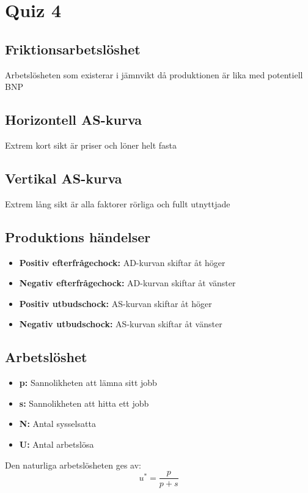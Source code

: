 \documentclass[12pt,a4paper]{article}
\begin{document}
\section{Quiz 4}
\subsection{Friktionsarbetslöshet}
Arbetslösheten som existerar i jämnvikt då produktionen är lika med potentiell BNP

\subsection{Horizontell AS-kurva}
Extrem kort sikt är priser och löner helt fasta

\subsection{Vertikal AS-kurva}
Extrem lång sikt är alla faktorer rörliga och fullt utnyttjade

\subsection{Produktions händelser}
\begin{itemize}
    \item \textbf{Positiv efterfrågechock: }AD-kurvan skiftar åt höger
    \item \textbf{Negativ efterfrågechock: }AD-kurvan skiftar åt vänster
    \item \textbf{Positiv utbudschock: }AS-kurvan skiftar åt höger
    \item \textbf{Negativ utbudschock: }AS-kurvan skiftar åt vänster
\end{itemize}

\subsection{Arbetslöshet}
\begin{itemize}
    \item \textbf{p: }Sannolikheten att lämna sitt jobb
    \item \textbf{s: }Sannolikheten att hitta ett jobb
    \item \textbf{N: }Antal sysselsatta
    \item \textbf{U: }Antal arbetslösa
\end{itemize}
Den naturliga arbetslösheten ges av:
\[
u^* = \frac{p}{p+s}
\]
\end{document}
